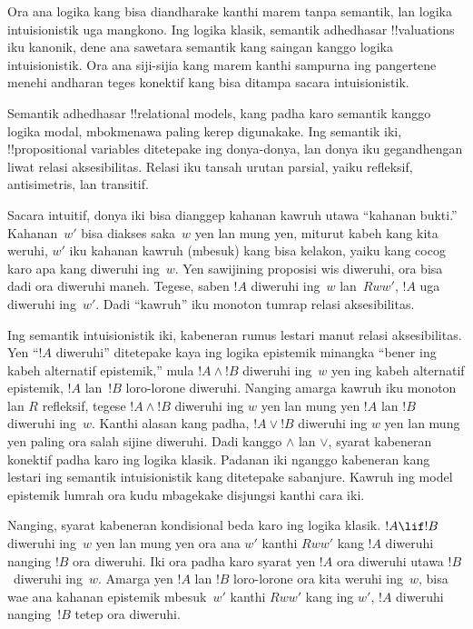 \documentclass[../../../include/open-logic-section]{subfiles}
\begin{document}


Ora ana logika kang bisa diandharake kanthi marem tanpa semantik,
lan logika intuisionistik uga mangkono. Ing logika klasik, semantik
adhedhasar !!{valuation}s iku kanonik, dene ana sawetara semantik
kang saingan kanggo logika intuisionistik. Ora ana siji-sijia kang
marem kanthi sampurna ing pangertene menehi andharan teges konektif
kang bisa ditampa sacara intuisionistik.

Semantik adhedhasar !!{relational model}s, kang padha karo semantik
kanggo logika modal, mbokmenawa paling kerep digunakake. Ing semantik
iki, !!{propositional variable}s ditetepake ing donya-donya, lan donya
iku gegandhengan liwat relasi aksesibilitas. Relasi iku tansah urutan
parsial, yaiku refleksif, antisimetris, lan transitif.

Sacara intuitif, donya iki bisa dianggep kahanan kawruh utawa
``kahanan bukti.'' Kahanan~$w'$ bisa diakses saka~$w$ yen lan mung
yen, miturut kabeh kang kita weruhi, $w'$ iku kahanan kawruh
(mbesuk) kang bisa kelakon, yaiku kang cocog karo apa kang diweruhi
ing~$w$. Yen sawijining proposisi wis diweruhi, ora bisa dadi ora
diweruhi maneh. Tegese, saben $!A$ diweruhi ing~$w$ lan~$Rww'$,
$!A$ uga diweruhi ing~$w'$. Dadi ``kawruh'' iku monoton tumrap
relasi aksesibilitas.

Ing semantik intuisionistik iki, kabeneran rumus lestari manut relasi aksesibilitas. Yen ``$!A$ diweruhi'' ditetepake kaya ing logika epistemik minangka
``bener ing kabeh alternatif epistemik,'' mula $!A \land !B$
diweruhi ing~$w$ yen ing kabeh alternatif epistemik, $!A$ lan~$!B$
loro-lorone diweruhi. Nanging amarga kawruh iku monoton lan $R$
refleksif, tegese $!A \land !B$ diweruhi ing $w$ yen lan mung yen
$!A$ lan $!B$ diweruhi ing~$w$. Kanthi alasan kang padha,
$!A \lor !B$ diweruhi ing $w$ yen lan mung yen paling ora salah
sijine diweruhi. Dadi kanggo $\land$ lan $\lor$, syarat kabeneran
konektif padha karo ing logika klasik.
Padanan iki nganggo kabeneran kang lestari ing semantik intuisionistik kang ditetepake sabanjure. Kawruh ing model epistemik lumrah ora kudu mbagekake disjungsi kanthi cara iki.

Nanging, syarat kabeneran kondisional beda karo ing logika klasik.
$!A \lif !B$ diweruhi ing~$w$ yen lan mung yen ora ana $w'$ kanthi
$Rww'$ kang $!A$ diweruhi nanging $!B$ ora diweruhi. Iki ora padha
karo syarat yen $!A$ ora diweruhi utawa $!B$~diweruhi ing~$w$.
Amarga yen $!A$ lan $!B$ loro-lorone ora kita weruhi ing~$w$, bisa wae ana
kahanan epistemik mbesuk~$w'$ kanthi $Rww'$ kang ing $w'$, $!A$
diweruhi nanging~$!B$ tetep ora diweruhi.
\end{document}
